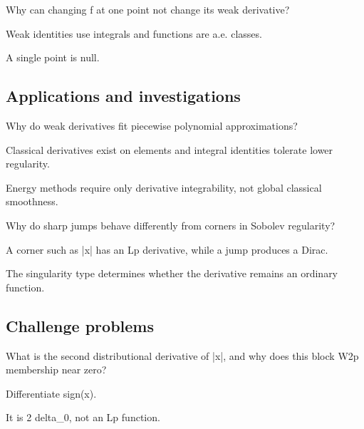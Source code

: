 \begin{exercise}\label{exr:iii20-expand-12}
Why can changing f at one point not change its weak derivative?
\end{exercise}
\begin{hint}
Weak identities use integrals and functions are a.e. classes.
\end{hint}
\begin{solution}
A single point is null.
\end{solution}

\subsection*{Applications and investigations}

\begin{exercise}\label{exr:iii20-expand-13}
Why do weak derivatives fit piecewise polynomial approximations?
\end{exercise}
\begin{hint}
Classical derivatives exist on elements and integral identities tolerate lower regularity.
\end{hint}
\begin{solution}
Energy methods require only derivative integrability, not global classical smoothness.
\end{solution}

\begin{exercise}\label{exr:iii20-expand-14}
Why do sharp jumps behave differently from corners in Sobolev regularity?
\end{exercise}
\begin{hint}
A corner such as |x| has an Lp derivative, while a jump produces a Dirac.
\end{hint}
\begin{solution}
The singularity type determines whether the derivative remains an ordinary function.
\end{solution}

\subsection*{Challenge problems}

\begin{exercise}\label{exr:iii20-expand-15}
What is the second distributional derivative of |x|, and why does this block W2p membership near zero?
\end{exercise}
\begin{hint}
Differentiate sign(x).
\end{hint}
\begin{solution}
It is 2 delta\_0, not an Lp function.
\end{solution}

